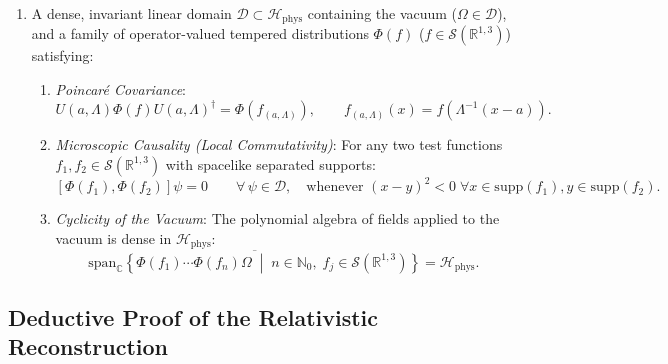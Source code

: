 \begin{theorem}
\begin{enumerate}[label=\textup{(\arabic*)}]
    \item A dense, invariant linear domain $\mathcal{D} \subset \mathcal{H}_{\mathrm{phys}}$ containing the vacuum ($\Omega \in \mathcal{D}$), and a family of operator-valued tempered distributions $\Phi(f)$ ($f \in \mathcal{S}(\mathbb{R}^{1,3})$) satisfying:
    \begin{enumerate}[label=\textup{(\alph*)}]
        \item \emph{Poincar\'e Covariance}:
        \begin{equation}
        U(a, \Lambda) \Phi(f) U(a, \Lambda)^\dagger = \Phi(f_{(a, \Lambda)}), \qquad f_{(a, \Lambda)}(x) = f(\Lambda^{-1}(x - a)).
        \end{equation}
        \item \emph{Microscopic Causality (Local Commutativity)}: For any two test functions $f_1, f_2 \in \mathcal{S}(\mathbb{R}^{1,3})$ with spacelike separated supports:
        \begin{equation}
        \label{eq:w3_microcausality_recon}
        [\Phi(f_1), \Phi(f_2)] \psi = 0 \qquad \forall \, \psi \in \mathcal{D}, \quad \text{whenever } (x - y)^2 < 0 \; \forall x \in \mathrm{supp}(f_1), y \in \mathrm{supp}(f_2).
        \end{equation}
        \item \emph{Cyclicity of the Vacuum}: The polynomial algebra of fields applied to the vacuum is dense in $\mathcal{H}_{\mathrm{phys}}$:
        \begin{equation}
        \overline{\mathrm{span}_{\mathbb{C}} \left\{ \Phi(f_1) \cdots \Phi(f_n) \Omega \;\middle|\; n \in \mathbb{N}_0, \; f_j \in \mathcal{S}(\mathbb{R}^{1,3}) \right\}} = \mathcal{H}_{\mathrm{phys}}.
        \end{equation}
    \end{enumerate}
\end{enumerate}
\end{theorem}

\subsection{Deductive Proof of the Relativistic Reconstruction}
\label{subsec:proof_os_reconstruction}

